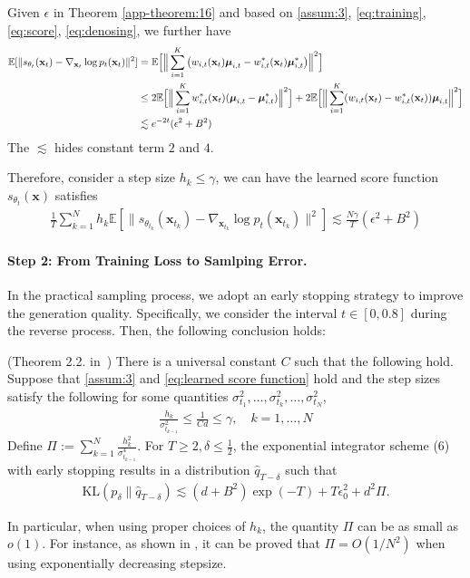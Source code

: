 Given $\epsilon$ in Theorem \ref{app-theorem:16} and based on \cref{assum:3}, \cref{eq:training}, \cref{eq:score}, \cref{eq:denosing}, we further have
\begin{align}
    \mathbb{E}[\|s_{\theta_t}(\mathbf x_t) - \nabla_{\mathbf x_t} \log p_t(\mathbf x_t)\|^2]
    &= \mathbb{E}\Big[\Big\|\sum_{i=1}^K \big(w_{i,t}(\mathbf x_t) \boldsymbol{{\mu}}_{i,t} - w_{i,t}^*(\mathbf x_t) \boldsymbol{{\mu}}_{i,t}^*\big)\Big\|^2\Big] \notag\\
    &\leq 2\mathbb{E}\Big[\Big\|\sum_{i=1}^K w_{i,t}^*(\mathbf x_t) (\boldsymbol{{\mu}}_{i,t} - \boldsymbol{{\mu}}_{i,t}^*)\Big\|^2\Big] 
    + 2\mathbb{E}\Big[\Big\|\sum_{i=1}^K (w_{i,t}(\mathbf x_t) - w_{i,t}^*(\mathbf x_t)) \boldsymbol{{\mu}}_{i,t}\Big\|^2\Big] \notag\\
    & \lesssim e^{-2t}(\epsilon^2 + B^2)
\end{align}
The $\lesssim$ hides constant term $2$ and $4$.

Therefore, consider a step size $h_k \le \gamma$, we can have the learned score function $s_{\theta_t}(\mathbf x)$ satisfies
\begin{align}
\label{eq:learned score function}
    \frac{1}{T} \sum^N_{k=1} h_k \mathbb{E}[\|s_{\theta_{t_k}}(\mathbf x_{t_k}) - \nabla_{\mathbf x_{t_k}} \log p_t(\mathbf x_{t_k})\|^2]  \lesssim \frac{N\gamma}{T}(\epsilon^2 + B^2)
\end{align}

\paragraph{Step 2: From Training Loss to Samlping Error.}
In the practical sampling process, we adopt an early stopping strategy to improve the generation quality. Specifically, we consider the interval $t \in [0,0.8]$ during the reverse process. Then, the following conclusion holds:
\begin{theorem}
\label{app-theorem:2.2-o}
(Theorem 2.2.  in~\citep{chen2023improved})
There is a universal constant \(C\) such that the following hold. Suppose that \cref{assum:3} and \cref{eq:learned score function} hold and the step sizes satisfy the following for some quantities $\sigma_{t_1}^2,\dots,\sigma_{t_k}^2,\dots,\sigma_{t_N}^2$,
\begin{align}
    \frac{h_k}{\sigma_{t_{k-1}}^2} \leq \frac{1}{Cd} \le \gamma, \quad k = 1, \ldots, N
\end{align}
Define \(\Pi := \sum_{k=1}^N \frac{h_k^2}{\sigma_{t_{k-1}}^4}\). For \(T \geq 2, \delta \leq \frac{1}{2}\), the exponential integrator scheme (6) with early stopping results in a distribution \(\hat{q}_{T-\delta}\) such that
\begin{align}
    \mathrm{KL}(p_\delta \| \hat{q}_{T-\delta}) \lesssim (d + B^2) \exp(-T) + T \epsilon^2_0 + d^2 \Pi.
\end{align}
\end{theorem}
In particular, when using proper choices of $h_k$, the quantity $\Pi$ can be as small as $o(1)$. For instance, as shown in \citet{chen2023improved}, it can be proved that $\Pi=O(1/N^2)$ when using exponentially decreasing stepsize.


